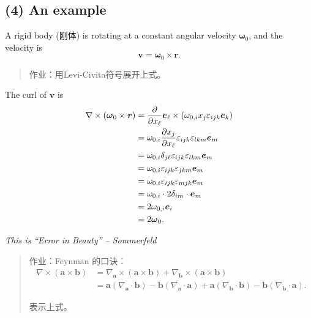 \subsection*{(4) An example}\label{an-example}

A rigid body (刚体) is rotating at a constant angular velocity
\(\boldsymbol \omega_0\), and the velocity is
\[\boldsymbol v = \boldsymbol \omega_0 \times \boldsymbol r.\]

\begin{quote}
作业：用Levi-Civita符号展开上式。
\end{quote}

The curl of \(\boldsymbol v\) is \begin{align*}
    \nabla \times \left( \boldsymbol \omega_0 \times \boldsymbol r\right)
    & = {\partial \over \partial x_\ell} \boldsymbol e_\ell \times \left(\omega_{0, i} x_j \varepsilon_{ijk} \boldsymbol e_k \right) \\
    & = \omega_{0, i} {\partial x_j \over \partial x_\ell} \varepsilon_{ijk} \varepsilon_{lkm} \boldsymbol e_m \\
    & = \omega_{0, i} \delta_{j \ell} \varepsilon_{ijk} \varepsilon_{lkm} \boldsymbol e_m \\
    & = \omega_{0, i} \varepsilon_{ijk} \varepsilon_{jkm} \boldsymbol e_m \\
    & = \omega_{0, i} \varepsilon_{ijk} \varepsilon_{mjk} \boldsymbol e_m \\
    & = \omega_{0, i} \cdot 2 \delta_{im} \cdot \boldsymbol e_m \\
    & = 2 \omega_{0, i} \boldsymbol e_i \\
    & = 2 \boldsymbol \omega_0.
\end{align*}

\emph{This is ``Error in Beauty'' -- Sommerfeld}

\begin{quote}
作业：Feynman 的口诀：\begin{align*}
\nabla \times \left( \boldsymbol a \times \boldsymbol b \right) & = \nabla_{\boldsymbol a} \times \left( \boldsymbol a \times \boldsymbol b \right) + \nabla_{\boldsymbol b} \times \left( \boldsymbol a \times \boldsymbol b \right) \\
& = \boldsymbol a \left(\nabla_{\boldsymbol a} \cdot \boldsymbol b \right) - \boldsymbol b \left(\nabla_{\boldsymbol a} \cdot \boldsymbol a \right) + \boldsymbol a \left(\nabla_{\boldsymbol b} \cdot \boldsymbol b \right) - \boldsymbol b \left(\nabla_{\boldsymbol b} \cdot \boldsymbol a \right).
\end{align*}

表示上式。
\end{quote}

